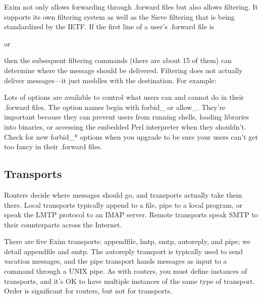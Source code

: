 Exim not only allows forwarding through {.forward} files but also allows
filtering. It supports its own filtering system as well as the Sieve
filtering that is being standardized by the IETF. If the first line of a
user's {.forward} file is


or


then the subsequent filtering commands (there are about 15 of them) can
determine where the message should be delivered. Filtering does not
actually deliver messages---it just meddles with the destination. For
example:


Lots of options are available to control what users can and cannot do in
their
\protect\hypertarget{part0026_split_050.htmlux5cux23_idIndexMarker2661}{}{}{.forward}
files. The option names begin with {forbid\_} or {allow\_}. They're
important because they can prevent users from running shells, loading
libraries into binaries, or accessing the embedded Perl interpreter when
they shouldn't. Check for new {forbid\_*} options when you upgrade to be
sure your users can't get too fancy in their {.forward} files.

\protect\hypertarget{part0026_split_051.html}{}{}

\hypertarget{part0026_split_051.htmlux5cux23_idContainer1247}{}
\hypertarget{part0026_split_051.htmlux5cux23calibre_pb_50}{%
\subsection[Transports]{\texorpdfstring{\protect\hypertarget{part0026_split_051.htmlux5cux23_idTextAnchor1154}{}{}Transports}{Transports}}\label{part0026_split_051.htmlux5cux23calibre_pb_50}}

\protect\hypertarget{part0026_split_051.htmlux5cux23_idIndexMarker2662}{}{}Rou\protect\hypertarget{part0026_split_051.htmlux5cux23_idTextAnchor1155}{}{}ters
decide where messages should go, and transports actually take them
there. Local transports typically append to a file, pipe to a local
program, or speak the LMTP protocol to an IMAP server. Remote transports
speak SMTP to their counterparts across the Internet.

There are five Exim transports: {appendfile}, {lmtp}, {smtp},
{autoreply}, and {pipe}; we detail {appendfile} and {smtp}. The
\protect\hypertarget{part0026_split_051.htmlux5cux23_idIndexMarker2663}{}{}{autoreply}
transport is typically used to send vacation messages, and the {pipe}
transport hands messages as input to a command through a UNIX pipe. As
with routers, you must define instances of transports, and it's OK to
have multiple instances of the same type of transport. Order is
significant for routers, but not for transports.

